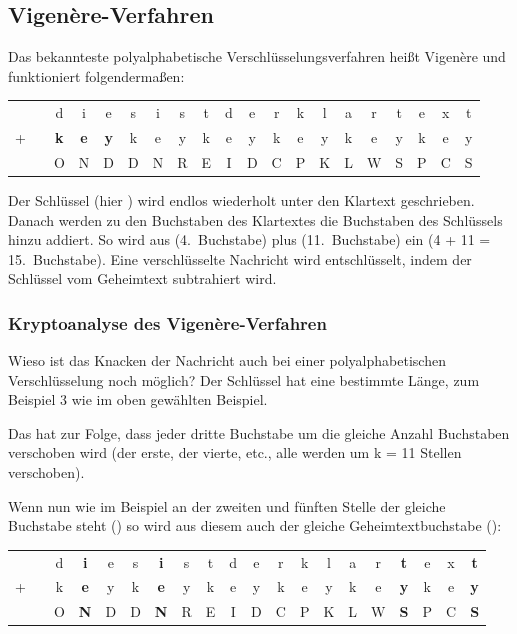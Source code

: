 \subsection{Vigenère-Verfahren}

Das bekannteste polyalphabetische Verschlüsselungsverfahren heißt Vigenère und
funktioniert folgendermaßen:

\bgroup
\def\arraystretch{1.2}
\setlength{\tabcolsep}{.5em}
\begin{tabular}{cccccccccccccccccccc}
  & & d & i & e & s & i & s & t & d & e & r & k & l & a & r & t & e & x & t \\
+ & & \textbf{k} & \textbf{e} & \textbf{y} & k & e & y & k & e & y & k & e & y &
k & e & y & k & e & y
\\
\hline
  & & O & N & D & D & N & R & E & I & D & C & P & K & L & W & S & P & C & S \\
\end{tabular}
\egroup   
   
Der Schlüssel (hier ) wird endlos wiederholt unter den Klartext
geschrieben. Danach werden zu den Buchstaben des Klartextes die Buchstaben des
Schlüssels hinzu addiert. So wird aus  (4.~Buchstabe) plus
 (11.~Buchstabe) ein  (4 + 11 = 15.~Buchstabe).
Eine verschlüsselte Nachricht wird entschlüsselt, indem der Schlüssel vom
Geheimtext subtrahiert wird.

\subsubsection{Kryptoanalyse des Vigenère-Verfahren}

Wieso ist das Knacken der Nachricht auch bei einer polyalphabetischen
Verschlüsselung noch möglich? Der Schlüssel hat eine bestimmte Länge, zum
Beispiel 3 wie im oben gewählten Beispiel.

Das hat zur Folge, dass jeder dritte Buchstabe um die gleiche Anzahl Buchstaben
verschoben wird (der erste, der vierte, etc., alle werden um k = 11 Stellen
verschoben).

Wenn nun wie im Beispiel an der zweiten und fünften Stelle der gleiche Buchstabe
steht () so wird aus diesem auch der gleiche Geheimtextbuchstabe
():

\bgroup
\def\arraystretch{1.2}
\setlength{\tabcolsep}{.5em}
\begin{tabular}{cccccccccccccccccccc}
  & & d & \textbf{i} & e & s & \textbf{i} & s & t & d & e & r & k & l & a & r &
  \textbf{t} & e & x & \textbf{t}
  \\
+ & & k & \textbf{e} & y & k & \textbf{e} & y & k & e & y & k & e & y &
k & e & \textbf{y} & k & e & \textbf{y}
\\
\hline
  & & O & \textbf{N} & D & D & \textbf{N} & R & E & I & D & C & P & K & L & W &
  \textbf{S} & P & C & \textbf{S}
  \\
\end{tabular}
\egroup


